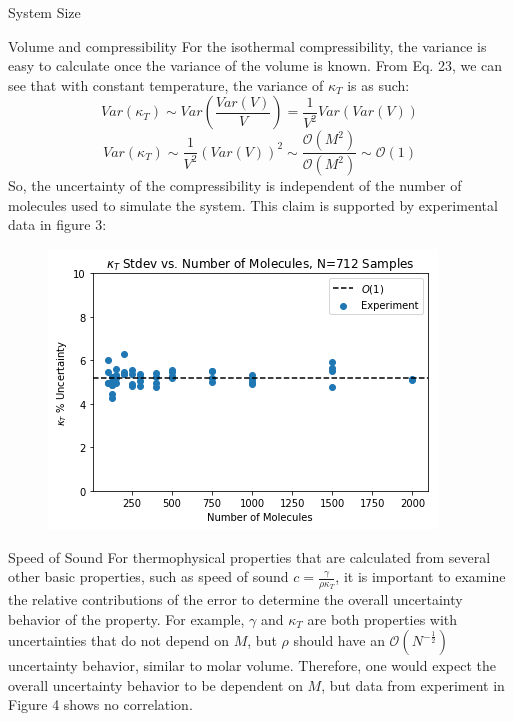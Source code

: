 \documentclass[aps,pre,twocolumn,nofootinbib,superscriptaddress,linenumbers,10pt, draft,tightenlines]{revtex4-1}
\begin{document}
\begin{subsection}{System Size}
\begin{subsubsection}{Volume and compressibility}
For the isothermal compressibility, the variance is easy to calculate once the variance of the volume is known.  From Eq. 23, we can see that with constant temperature, the variance of $\kappa_T$ is as such:
\begin{equation}
Var(\kappa_T) \sim Var \left( \frac{Var(V)}{V}\right) = \frac{1}{V^2}Var(Var(V))
\end{equation}
\begin{equation}
Var(\kappa_T) \sim \frac{1}{V^2} (Var(V))^2 \sim \frac{\mathcal{O}(M^2)}{\mathcal{O}(M^2)} \sim \mathcal{O}(1)
\end{equation}
So, the uncertainty of the compressibility is independent of the number of molecules used to simulate the system.  This claim is supported by experimental data in figure 3:  
\begin{figure}[H]
\includegraphics[width=\textwidth]{../figures/kt_stdev_vs_M.png}
\end{figure}
\end{subsubsection}
\begin{subsubsection}{Speed of Sound}
For thermophysical properties that are calculated from several other basic properties, such as speed of sound $c=\frac{\gamma}{\rho \kappa_T}$, it is important to examine the relative contributions of the error to determine the overall uncertainty behavior of the property.  For example, $\gamma$ and $\kappa_T$ are both properties with uncertainties that do not depend on $M$, but $\rho$ should have an $\mathcal{O}(N^{-\frac{1}{2}})$ uncertainty behavior, similar to molar volume.  Therefore, one would expect the overall uncertainty behavior to be dependent on $M$, but data from experiment in Figure 4 shows no correlation. 

\end{subsubsection}
\end{subsection}
\end{document}
